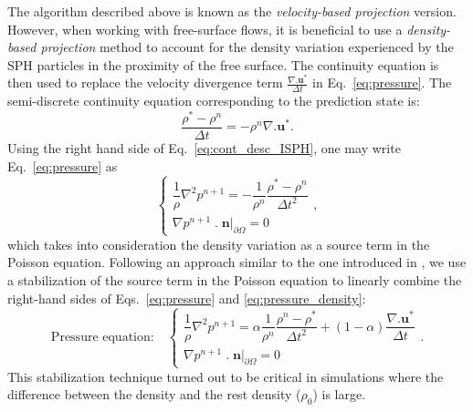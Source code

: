 The algorithm described above is known as the \textit{velocity-based projection} version. However, when working with free-surface flows, it is beneficial to use a \textit{density-based projection} method \cite{asai2012stabilized} to account for the density variation experienced by the SPH particles in the proximity of the free surface. The continuity equation is then used to replace the velocity divergence term $\frac{\nabla.\mathbf{u}^*}{\Delta t}$ in Eq.~\ref{eq:pressure}. The semi-discrete continuity equation corresponding to the prediction state is:
\begin{equation}\label{eq:cont_desc_ISPH}
\dfrac{\rho^*-\rho^n}{\Delta t}=-\rho^n \nabla.\mathbf{u}^*.
\end{equation}
Using the right hand side of Eq.~\ref{eq:cont_desc_ISPH}, one may write  Eq.~\ref{eq:pressure} as
\begin{equation}\label{eq:pressure_density}
\begin{cases}
\dfrac{1}{\rho} \nabla^2 p^{n+1}=-\dfrac{1}{\rho^n}\dfrac{\rho^*-\rho^n}{\Delta t^2}\\
\nabla p^{n+1}\;.\;\mathbf{n}|_{\partial \Omega}=0
\end{cases},
\end{equation}
which takes into consideration the density variation as a source term in the Poisson equation. Following an approach similar to the one introduced in \cite{asai2012stabilized}, we use a stabilization of the source term in the Poisson equation to linearly combine the right-hand sides of Eqs.~\ref{eq:pressure} and \ref{eq:pressure_density}:
\begin{equation*}
\text{Pressure equation:} \quad
\begin{cases}
\dfrac{1}{\rho} \nabla^2 p^{n+1}=\alpha\dfrac{1}{\rho^n}\dfrac{\rho^n-\rho^*}{\Delta t^2} + (1-\alpha) \dfrac{\nabla.\mathbf{u}^*}{\Delta t}\\
\nabla p^{n+1}\;.\;\mathbf{n}|_{\partial \Omega}=0
\end{cases}.
\end{equation*}
This stabilization technique turned out to be critical in simulations where the difference between the density and the rest density ($\rho_0$) is large.

